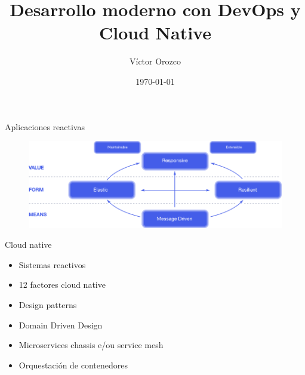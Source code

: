 \documentclass[aspectratio=169]{beamer}
\title{Desarrollo moderno con DevOps y Cloud Native}
\author{Víctor Orozco}
\institute{Nabenik}
\date{\today}
\begin{document}
{
    \frame{\titlepage}
}


\begin{frame}{Aplicaciones reactivas}

\begin{figure}
	\centering
	\includegraphics[width=\linewidth]{Images/reactive-traits.png}
\end{figure}

\end{frame}




\begin{frame}{Cloud native}

	\begin{itemize}
		\item Sistemas reactivos
		\item 12 factores cloud native
        \item Design patterns
        \item Domain Driven Design
		\item Microservices chassis e/ou service mesh
        \item Orquestación de contenedores
	\end{itemize}

\end{frame}
\end{document}
